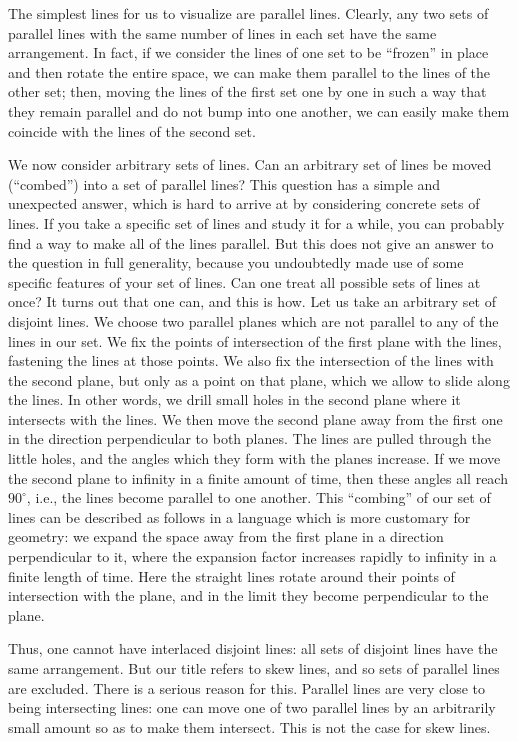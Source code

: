 \documentclass{article}
\begin{document}
The simplest lines for us to visualize are parallel lines. Clearly, any two
sets of parallel lines with the same number of lines in each set have the same
arrangement. In fact, if we consider the lines of one set to be ``frozen'' in
place and then rotate the entire space, we can make them parallel to the lines
of the other set; then, moving the lines of the first set one by one in such a
way that they remain parallel and do not bump into one another, we can easily
make them coincide with the lines of the second set.


We now consider arbitrary sets of lines. Can an arbitrary set of lines be moved
(``combed'') into a set of parallel lines? This question has a simple and
unexpected answer, which is hard to arrive at by considering concrete sets of
lines. If you take a specific set of lines and study it for a while, you can
probably find a way to make all of the lines parallel. But this does not give
an answer to the question in full generality, because you undoubtedly made use
of some specific features of your set of lines. Can one treat all possible sets
of lines at once? It turns out that one can, and this is how. Let us take an
arbitrary set of disjoint lines. We choose two parallel planes which are not
parallel to any of the lines in our set. We fix the points of intersection of
the first plane with the lines, fastening the lines at those points. We also fix
the intersection of the lines with the second plane, but only as a point on that
plane, which we allow to slide along the lines. In other words, we drill small
holes in the second plane where it intersects with the lines. We then move the
second plane away from the first one in the direction perpendicular to both
planes. The lines are pulled through the little holes, and the angles which
they form with the planes increase. If we move the second plane to infinity in a
finite amount of time, then these angles all reach $90^\circ$, i.e., the lines
become parallel to one another. This ``combing'' of our set of lines can be
described as follows in a language which is more customary for geometry: we
expand the space away from the first plane in a direction perpendicular to it,
where the expansion factor increases rapidly to infinity in a finite length of
time. Here the straight lines rotate around their points of intersection with
the plane, and in the limit they become perpendicular to the plane.


Thus, one cannot have interlaced disjoint lines: all sets of disjoint lines
have the same arrangement. But our title refers to skew lines, and so sets of
parallel lines are excluded. There is a serious reason for this. Parallel lines
are very close to being intersecting lines: one can move one of two parallel
lines by an arbitrarily small amount so as to make them intersect. This is not
the case for skew lines.
\end{document}
